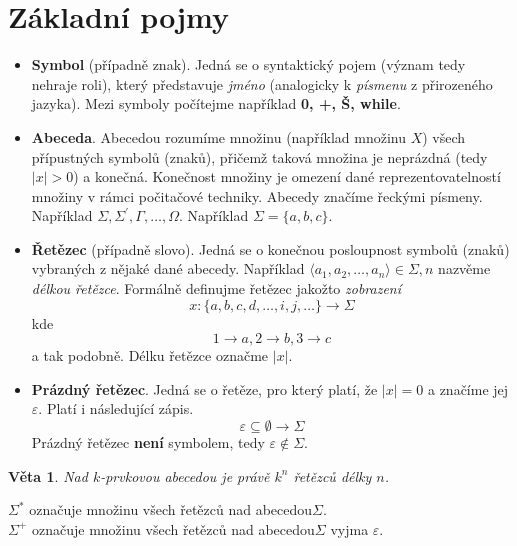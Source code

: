 \documentclass[10pt, a4paper, titlepage]{article}
\theoremstyle{note}
\newtheorem{veta}{\textbf{Věta}}
\begin{document}
\section{Základní pojmy}
\begin{itemize}
\item
\textbf{Symbol} (případně znak). Jedná se o syntaktický pojem (význam tedy nehraje roli), který představuje \emph{jméno} (analogicky k \emph{písmenu} z přirozeného jazyka).
Mezi symboly počítejme například \textbf{0, +, Š, while}.

\item
\textbf{Abeceda}. Abecedou rozumíme množinu (například množinu $X$) všech přípustných symbolů (znaků), přičemž taková množina je neprázdná (tedy $|x|>0$) a konečná.
Konečnost množiny je omezení dané reprezentovatelností množiny v rámci počitačové techniky.
Abecedy značíme řeckými písmeny. Například $\Sigma, \Sigma^{'}, \Gamma, \ldots, \Omega$.
Například $\Sigma = \lbrace a, b, c \rbrace$.

\item
\textbf{Řetězec} (případně slovo). Jedná se o konečnou posloupnost symbolů (znaků) vybraných z nějaké dané abecedy.
Například $\langle a_{1}, a_{2}, \ldots, a_{n} \rangle \in \Sigma, n$ nazvěme \emph{délkou řetězce}.
Formálně definujme řetězec jakožto \emph{zobrazení} $$x : \lbrace a, b, c, d, \ldots, i, j, \ldots \rbrace \rightarrow \Sigma $$
kde $$1 \rightarrow a, 2 \rightarrow b, 3 \rightarrow c$$ a tak podobně.
Délku řetězce označme $|x|$.

\item
\textbf{Prázdný řetězec}. Jedná se o řetěze, pro který platí, že $|x| = 0$ a značíme jej $\varepsilon$. Platí i následující zápis.
$$\varepsilon \subseteq \emptyset \rightarrow \Sigma$$
Prázdný řetězec \textbf{není} symbolem, tedy $\varepsilon \notin \Sigma$.
\end{itemize}

\begin{veta}
Nad $k$-prvkovou abecedou je právě $k^{n}$ řetězců délky $n$.
\end{veta}

\noindent
$\Sigma^{*}$ označuje množinu všech řetězců nad abecedou$\Sigma$. \\
$\Sigma^{+}$ označuje množinu všech řetězců nad abecedou$\Sigma$ vyjma $\varepsilon$.
\end{document}
